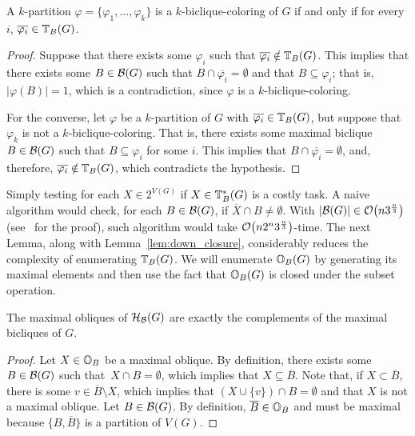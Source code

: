 \begin{lemma}
    \label{lem:transversal_colorings}
    A $k$-partition $\varphi = \{\varphi_1, \dots, \varphi_k\}$ is a $k$-biclique-coloring of $G$ if and only if for every $i$, $\overline{\varphi_i} \in \mathbb{T}_{B}(G)$.
\end{lemma}

\begin{proof}
    Suppose that there exists some $\varphi_i$ such that $\overline{\varphi_i} \notin \mathbb{T}_{B}(G)$.
    This implies that there exists some $B \in \mathcal{B}(G)$ such that $B \cap \overline{\varphi_i} = \emptyset$ and that $B \subseteq \varphi_i$; that is, $|\varphi(B)| = 1$, which is a contradiction, since $\varphi$ is a $k$-biclique-coloring.
    
    For the converse, let $\varphi$ be a $k$-partition of $G$ with $\overline{\varphi_i} \in \mathbb{T}_{B}(G)$, but suppose that $\varphi_k$ is not a $k$-biclique-coloring.
    That is, there exists some maximal biclique $B \in \mathcal{B}(G)$ such that $B \subseteq \varphi_i$ for some $i$.
    This implies that $B \cap \overline{\varphi_i} = \emptyset$, and, therefore, $\overline{\varphi_i} \notin \mathbb{T}_{B}(G)$, which contradicts the hypothesis.
\end{proof}

Simply testing for each $X \in 2^{V(G)}$ if $X \in \mathbb{T}^*_{B}(G)$ is a costly task.
A naive algorithm would check, for each $B \in \mathcal{B}(G)$, if $\overline{X} \cap B \neq \emptyset$.
With $|\mathcal{B}(G)| \in \mathcal{O}\!\left(n3^{\frac{n}{3}}\right)$ (see~\cite{gaspers} for the proof), such algorithm would take $\mathcal{O}\!\left(n2^n3^{\frac{n}{3}}\right)$-time.
The next Lemma, along with Lemma~\ref{lem:down_closure}, considerably reduces the complexity of enumerating $\mathbb{T}_{B}(G)$.
We will enumerate $\mathbb{O}_{B}(G)$ by generating its maximal elements and then use the fact that $\mathbb{O}_{B}(G)$ is closed under the subset operation.

\begin{lemma}
    \label{lem:complementary_obliques}
    The maximal obliques of $\mathcal{H}_{\mathcal{B}}(G)$ are exactly the complements of the maximal bicliques of $G$.
\end{lemma}

\begin{proof}
    Let $X \in \mathbb{O}_{B}$ be a maximal oblique. By definition, there exists some~$B \in \mathcal{B}(G)$ such that~$X \cap B = \emptyset$, which implies that $X \subseteq \overline{B}$.
    Note that, if $X \subset \overline{B}$, there is some $v \in \overline{B} \setminus X$, which implies that $(X \cup \{v\}) \cap B = \emptyset$ and that $X$ is not a maximal oblique.
    Let $B \in \mathcal{B}(G)$. By definition, $\overline{B} \in \mathbb{O}_{B}$ and must be maximal because $\{B, \overline{B}\}$ is a partition of $V(G)$.
\end{proof}

